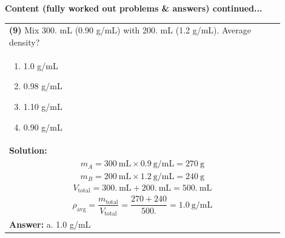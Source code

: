 \documentclass{article}
\begin{document}
{\newpage
\noindent
{\large\textbf{Content (fully worked out problems \& answers) continued...}}\\[0.2em]
\vspace{0.2cm}
\begin{tabular}{|p{0.9\linewidth}|}
\hline
\vspace{0.2cm}
\textbf{(9)} Mix 300. mL (0.90 g/mL) with 200. mL (1.2 g/mL). Average density? \\
\begin{minipage}[t]{0.85\linewidth}
\begin{enumerate}[label=\alph*.]
   \item 1.0 g/mL
   \item 0.98 g/mL
   \item 1.10 g/mL
   \item 0.90 g/mL
\end{enumerate}
\end{minipage}\\
\hline
\vspace{0.2cm}
\textbf{Solution:} \\
\[
m_A = 300~\text{mL} \times 0.9~\text{g/mL} = 270~\text{g}
\] \\
\[
m_B = 200~\text{mL} \times 1.2~\text{g/mL} = 240~\text{g}
\] \\
\[
V_\text{total} = 300.~\text{mL} + 200.~\text{mL} = 500.~\text{mL}
\] \\
\[
\rho_\text{avg} = \frac{m_\text{total}}{V_\text{total}} = \frac{270 + 240}{500.} = 1.0~\text{g/mL} 
\] \\ 
\hline
\vspace{0.2cm}
\textbf{Answer:} a. 1.0 g/mL \\
\hline
\end{tabular}

}
\end{document}
